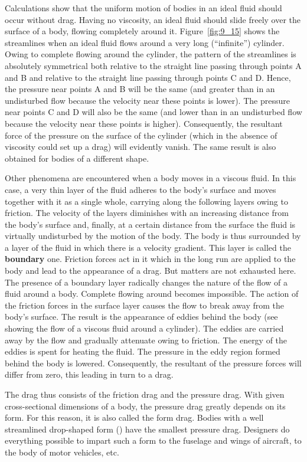 Calculations show that the uniform motion of bodies in an ideal fluid should occur without drag. Having no viscosity, an ideal fluid should slide freely over the surface of a body, flowing completely around it. Figure~\ref{fig:9_15} shows the streamlines when an ideal fluid flows around a very long (``infinite'') cylinder. Owing to complete flowing around the cylinder, the pattern of the streamlines is absolutely symmetrical both relative to the straight line passing through points A and B and relative to the straight line passing through points C and D. Hence, the pressure near points A and B will be the same (and greater than in an undisturbed flow because the velocity near these points is lower). The pressure near points C and D will also be the same (and lower than in an undisturbed flow because the velocity near these points is higher). Consequently, the resultant force of the pressure on the surface of the cylinder (which in the absence of viscosity could set up a drag) will evidently vanish. The same result is also obtained for bodies of a different shape.

Other phenomena are encountered when a body moves in a viscous fluid. In this case, a very thin layer of the fluid adheres to the body's surface and moves together with it as a single whole, carrying along the following layers owing to friction. The velocity of the layers diminishes with an increasing distance from the body's surface and, finally, at a certain distance from the surface the fluid is virtually undisturbed by the motion of the body. The body is thus surrounded by a layer of the fluid in which there is a velocity gradient. This layer is called the \textbf{boundary} one. Friction forces act in it which in the long run are applied to the body and lead to the appearance of a drag. But matters are not exhausted here. The presence of a boundary layer radically changes the nature of the flow of a fluid around a body. Complete flowing around becomes impossible. The action of the friction forces in the surface layer causes the flow to break away from the body's surface. The result is the appearance of eddies behind the body (see  showing the flow of a viscous fluid around a cylinder). The eddies are carried away by the flow and gradually attenuate owing to friction. The energy of the eddies is spent for heating the fluid. The pressure in the eddy region formed behind the body is lowered. Consequently, the resultant of the pressure forces will differ from zero, this leading in turn to a drag.

The drag thus consists of the friction drag and the pressure drag. With given cross-sectional dimensions of a body, the pressure drag greatly depends on its form. For this reason, it is also called the form drag. Bodies with a well streamlined drop-shaped form () have the smallest pressure drag. Designers do everything possible to impart such a form to the fuselage and wings of aircraft, to the body of motor vehicles, etc.

